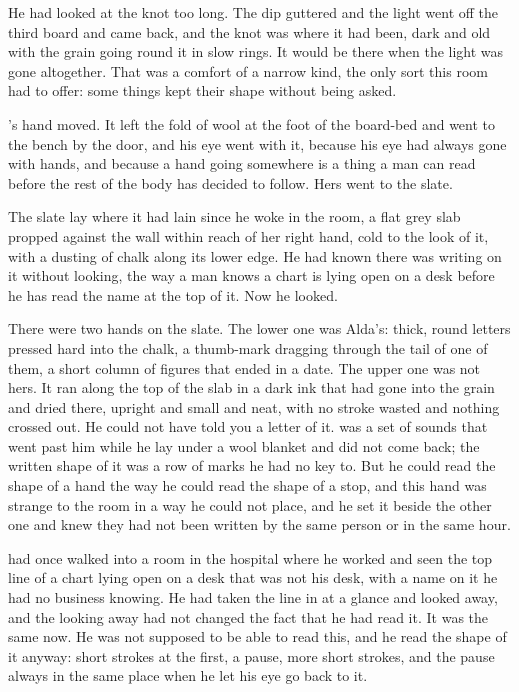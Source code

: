 He had looked at the knot too long. The dip guttered and the light went off the third board and came back, and the knot was where it had been, dark and old with the grain going round it in slow rings. It would be there when the light was gone altogether. That was a comfort of a narrow kind, the only sort this room had to offer: some things kept their shape without being asked.

's hand moved. It left the fold of wool at the foot of the board-bed and went to the bench by the door, and his eye went with it, because his eye had always gone with hands, and because a hand going somewhere is a thing a man can read before the rest of the body has decided to follow. Hers went to the slate.

The slate lay where it had lain since he woke in the room, a flat grey slab propped against the wall within reach of her right hand, cold to the look of it, with a dusting of chalk along its lower edge. He had known there was writing on it without looking, the way a man knows a chart is lying open on a desk before he has read the name at the top of it. Now he looked.

There were two hands on the slate. The lower one was Alda's: thick, round letters pressed hard into the chalk, a thumb-mark dragging through the tail of one of them, a short column of figures that ended in a date. The upper one was not hers. It ran along the top of the slab in a dark ink that had gone into the grain and dried there, upright and small and neat, with no stroke wasted and nothing crossed out. He could not have told you a letter of it.  was a set of sounds that went past him while he lay under a wool blanket and did not come back; the written shape of it was a row of marks he had no key to. But he could read the shape of a hand the way he could read the shape of a stop, and this hand was strange to the room in a way he could not place, and he set it beside the other one and knew they had not been written by the same person or in the same hour.

 had once walked into a room in the hospital where he worked and seen the top line of a chart lying open on a desk that was not his desk, with a name on it he had no business knowing. He had taken the line in at a glance and looked away, and the looking away had not changed the fact that he had read it. It was the same now. He was not supposed to be able to read this, and he read the shape of it anyway: short strokes at the first, a pause, more short strokes, and the pause always in the same place when he let his eye go back to it.

